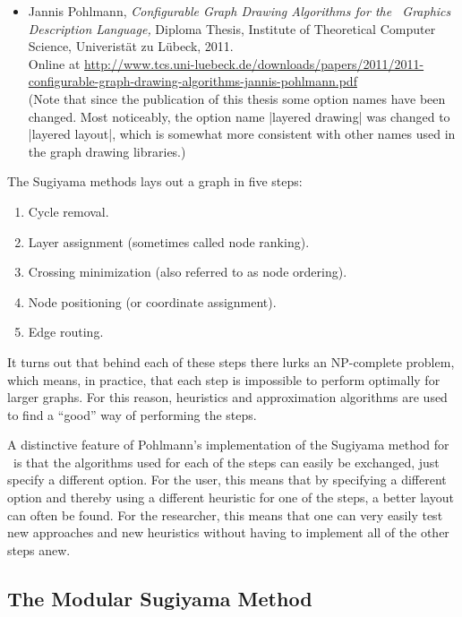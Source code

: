 \begin{itemize}
\item
  Jannis Pohlmann,
  \newblock \emph{Configurable Graph Drawing Algorithms
    for the \tikzname\ Graphics Description Language,}
  \newblock Diploma Thesis,
  \newblock Institute of Theoretical Computer Science, Univerist\"at
  zu L\"ubeck, 2011.\\[.5em]
  \newblock Online at 
  \url{http://www.tcs.uni-luebeck.de/downloads/papers/2011/2011-configurable-graph-drawing-algorithms-jannis-pohlmann.pdf}
  \\[.5em]
  (Note that since the publication of this thesis some option names
  have been changed. Most noticeably, the option name
  |layered drawing| was changed to |layered layout|, which is somewhat
  more consistent with other names used in the graph drawing
  libraries.) 
\end{itemize}

The Sugiyama methods lays out a graph in five steps:
\begin{enumerate}
\item Cycle removal.
\item Layer assignment (sometimes called node ranking).
\item Crossing minimization (also referred to as node ordering).
\item Node positioning (or coordinate assignment).
\item Edge routing.
\end{enumerate}
It turns out that behind each of these steps there lurks an
NP-complete problem, which means, in practice, that each step is
impossible to perform optimally for larger graphs. For this reason,
heuristics and approximation algorithms are used to find a ``good''
way of performing the steps.

A distinctive feature of Pohlmann's implementation of the Sugiyama
method for \tikzname\ is that the algorithms used for each of the
steps can easily be exchanged, just specify a different option. For
the user, this means that by specifying a different 
option and thereby using a different heuristic for one of the steps, a
better layout can often be found. For the researcher, this means that
one can very easily test new approaches and new heuristics without
having to implement all of the other steps anew. 



\subsection{The Modular Sugiyama Method}

